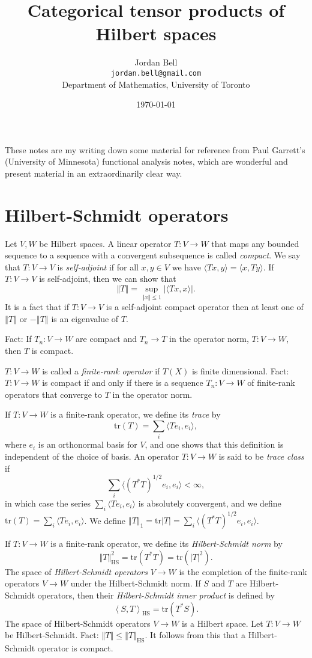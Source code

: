 \documentclass{article}
\newcommand{\HSnorm}[1]{\left\Vert #1 \right\Vert_{\textrm{HS}}}
\newcommand{\HSinner}[2]{\left\langle #1, #2 \right\rangle_{\textrm{HS}}}
\newcommand{\inner}[2]{\langle #1, #2 \rangle}
\newcommand{\tr}{\textrm{tr}}
\newcommand{\norm}[1]{\left\Vert #1 \right\Vert}
\begin{document}
\title{Categorical tensor products of Hilbert spaces}
\author{Jordan Bell\\ \texttt{jordan.bell@gmail.com}\\Department of Mathematics, University of Toronto}
\date{\today}

\maketitle

These notes are my writing down some material for reference from Paul Garrett's (University of Minnesota) functional analysis notes, which are wonderful and present material in an extraordinarily clear way.


\section{Hilbert-Schmidt operators}
Let $V,W$ be Hilbert spaces. A  linear operator $T:V \to W$ that maps any bounded sequence to a sequence with a convergent subsequence is called {\em compact}.
We say that $T:V \to V$ is {\em self-adjoint} if for all $x,y \in V$ we have $\inner{Tx}{y}=\inner{x}{Ty}$.
If $T:V \to V$ is self-adjoint, then we can show that
\[
\norm{T}=\sup_{\norm{x} \leq 1} |\inner{Tx}{x}|.
\]
It is a fact that if $T:V \to V$ is a self-adjoint compact operator then at least one of $\norm{T}$ or $-\norm{T}$ is an eigenvalue of $T$.


Fact: If $T_n:V \to W$ are compact and $T_n \to T$ in the operator norm, $T:V \to W$, then $T$ is compact.

$T:V \to W$ is called a {\em finite-rank operator} if $T(X)$ is finite dimensional. Fact: $T:V \to W$ is compact if and only if there is a sequence $T_n:V \to W$ of finite-rank operators that
converge to $T$ in the operator norm. 

If $T:V \to W$ is a finite-rank operator, we define its {\em trace} by
\[
\tr(T)=\sum_i \inner{Te_i}{e_i},
\]
where $e_i$ is an orthonormal basis for $V$, and one shows that this definition is independent of the choice of basis.
An operator $T:V \to W$ is said to be {\em trace class} if
\[
\sum_i \inner{(T^* T)^{1/2} e_i}{e_i}<\infty,
\]
in which case the series $\sum_i \inner{Te_i}{e_i}$ is absolutely convergent, and we define $\tr(T)=\sum_i \inner{Te_i}{e_i}$.
We define $\norm{T}_1 = \tr|T|=
\sum_i \inner{(T^* T)^{1/2} e_i}{e_i}$.

If $T: V \to W$ is a finite-rank operator, we define its {\em Hilbert-Schmidt norm} by
\[
\HSnorm{T}^2=\tr(T^*T)=\tr(|T|^2).
\]
The space of {\em Hilbert-Schmidt operators} $V \to W$ is the completion of
the finite-rank operators $V \to W$ under the Hilbert-Schmidt norm. If
$S$ and $T$ are Hilbert-Schmidt operators, then their {\em Hilbert-Schmidt inner product}
is defined by
\[
\HSinner{S}{T}=\tr(T^*S).
\]
The space of Hilbert-Schmidt operators $V \to W$ is a Hilbert space. 
Let $T:V \to W$ be Hilbert-Schmidt. Fact: $\norm{T} \leq \HSnorm{T}$. It follows from this
that a Hilbert-Schmidt operator is compact. 
\end{document}
